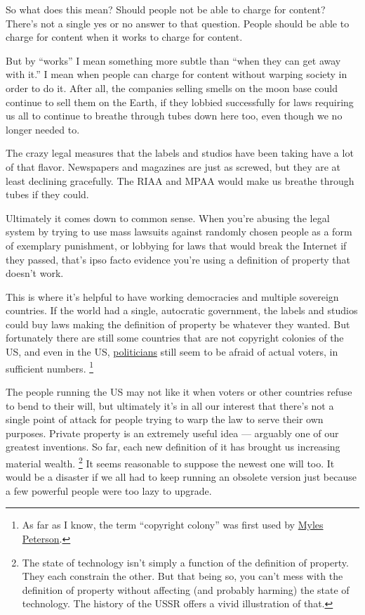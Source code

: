 \documentclass[12pt]{book}
\begin{document}
So what does this mean? Should people not be able to charge for content?
There's not a single yes or no answer to that question. People should be
able to charge for content when it works to charge for content.

But by ``works'' I mean something more subtle than ``when they can get
away with it.'' I mean when people can charge for content without
warping society in order to do it. After all, the companies selling
smells on the moon base could continue to sell them on the Earth, if
they lobbied successfully for laws requiring us all to continue to
breathe through tubes down here too, even though we no longer needed to.

The crazy legal measures that the labels and studios have been taking
have a lot of that flavor. Newspapers and magazines are just as screwed,
but they are at least declining gracefully. The RIAA and MPAA would make
us breathe through tubes if they could.

Ultimately it comes down to common sense. When you're abusing the legal
system by trying to use mass lawsuits against randomly chosen people as
a form of exemplary punishment, or lobbying for laws that would break
the Internet if they passed, that's ipso facto evidence you're using a
definition of property that doesn't work.

This is where it's helpful to have working democracies and multiple
sovereign countries. If the world had a single, autocratic government,
the labels and studios could buy laws making the definition of property
be whatever they wanted. But fortunately there are still some countries
that are not copyright colonies of the US, and even in the US,
\href{http://tctechcrunch2011.files.wordpress.com/2012/01/congress-on-sopa-done.png}{politicians}
still seem to be afraid of actual voters, in sufficient numbers.
\footnote{As far as I know, the term ``copyright colony'' was first used
by
\href{http://torrentfreak.com/australia-us-copyright-colony-or-just-a-good-friend-120121/}{Myles
Peterson}.}

The people running the US may not like it when voters or other countries
refuse to bend to their will, but ultimately it's in all our interest
that there's not a single point of attack for people trying to warp the
law to serve their own purposes. Private property is an extremely useful
idea --- arguably one of our greatest inventions. So far, each new
definition of it has brought us increasing material wealth.
\footnote{The state of technology isn't simply a function of the
definition of property. They each constrain the other. But that being
so, you can't mess with the definition of property without affecting
(and probably harming) the state of technology. The history of the USSR
offers a vivid illustration of that.} It seems reasonable to suppose the newest one
will too. It would be a disaster if we all had to keep running an
obsolete version just because a few powerful people were too lazy to
upgrade.
\end{document}
